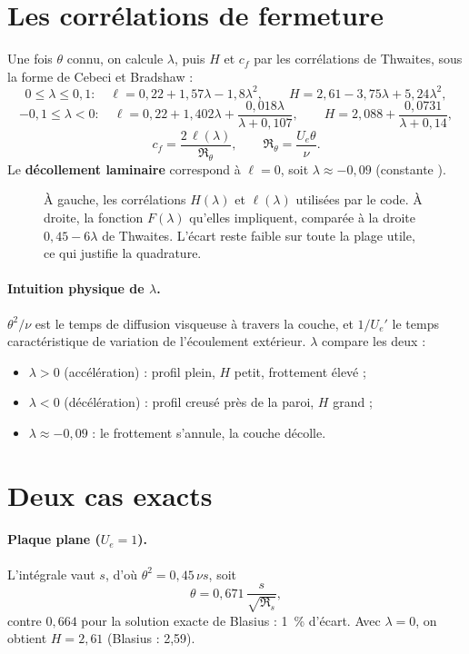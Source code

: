 \section{Les corrélations de fermeture}
Une fois $\theta$ connu, on calcule $\lambda$, puis $H$ et $c_f$ par les corrélations de Thwaites, sous la forme de Cebeci et Bradshaw :
\[
0\le\lambda\le0{,}1:\quad \ell=0{,}22+1{,}57\lambda-1{,}8\lambda^2,\qquad H=2{,}61-3{,}75\lambda+5{,}24\lambda^2,
\]
\[
-0{,}1\le\lambda<0:\quad \ell=0{,}22+1{,}402\lambda+\frac{0{,}018\lambda}{\lambda+0{,}107},\qquad H=2{,}088+\frac{0{,}0731}{\lambda+0{,}14},
\]
\[
c_f=\frac{2\,\ell(\lambda)}{\Re_\theta},\qquad \Re_\theta=\frac{U_e\theta}{\nu}.
\]
Le \textbf{décollement laminaire} correspond à $\ell=0$, soit $\lambda\approx-0{,}09$ (constante ).

\begin{figure}[htbp]
\centering

\caption{À gauche, les corrélations $H(\lambda)$ et $\ell(\lambda)$ utilisées par le code. À droite, la fonction $F(\lambda)$ qu'elles impliquent, comparée à la droite $0{,}45-6\lambda$ de Thwaites. L'écart reste faible sur toute la plage utile, ce qui justifie la quadrature.}\label{fig:thwaites-f}
\end{figure}

\paragraph{Intuition physique de $\lambda$.} $\theta^2/\nu$ est le temps de diffusion visqueuse à travers la couche, et $1/U_e'$ le temps caractéristique de variation de l'écoulement extérieur. $\lambda$ compare les deux :
\begin{itemize}
\item $\lambda>0$ (accélération) : profil plein, $H$ petit, frottement élevé ;
\item $\lambda<0$ (décélération) : profil creusé près de la paroi, $H$ grand ;
\item $\lambda\approx-0{,}09$ : le frottement s'annule, la couche décolle.
\end{itemize}

\section{Deux cas exacts}
\paragraph{Plaque plane ($U_e=1$).} L'intégrale vaut $s$, d'où $\theta^2=0{,}45\,\nu s$, soit
\[
\theta=0{,}671\,\frac{s}{\sqrt{\Re_s}},
\]
contre $0{,}664$ pour la solution exacte de Blasius : 1~\% d'écart. Avec $\lambda=0$, on obtient $H=2{,}61$ (Blasius : 2,59).

